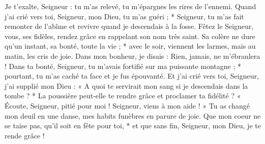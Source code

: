 Je t'exalte, Seigneur : tu m'as relevé, tu m'épargnes les rires de l'ennemi.
\versseparator
Quand j'ai crié vers toi, Seigneur, mon Dieu, tu m'as guéri ; *
\versseparator
Seigneur, tu m'as fait remonter de l'abîme et revivre quand je descendais à la fosse.
\versseparator
Fêtez le Seigneur, vous, ses fidèles, rendez grâce en rappelant son nom très saint.
\versseparator
Sa colère ne dure qu'un instant, sa bonté, toute la vie ; * avec le soir, viennent les larmes, mais au matin, les cris de joie.
\versseparator
Dans mon bonheur, je disais : Rien, jamais, ne m'ébranlera !
\versseparator
Dans ta bonté, Seigneur, tu m'avais fortifié sur ma puissante montagne ; * pourtant, tu m'as caché ta face et je fus épouvanté.
\versseparator
Et j'ai crié vers toi, Seigneur, j'ai supplié mon Dieu :
\versseparator
« A quoi te servirait mon sang si je descendais dans la tombe ? * La poussière peut-elle te rendre grâce et proclamer ta fidélité ?
\versseparator
« Écoute, Seigneur, pitié pour moi ! Seigneur, viens à mon aide ! »
\versseparator
Tu as changé mon deuil en une danse, mes habits funèbres en parure de joie.
\versseparator
Que mon coeur ne se taise pas, qu'il soit en fête pour toi, * et que sans fin, Seigneur, mon Dieu, je te rende grâce !
